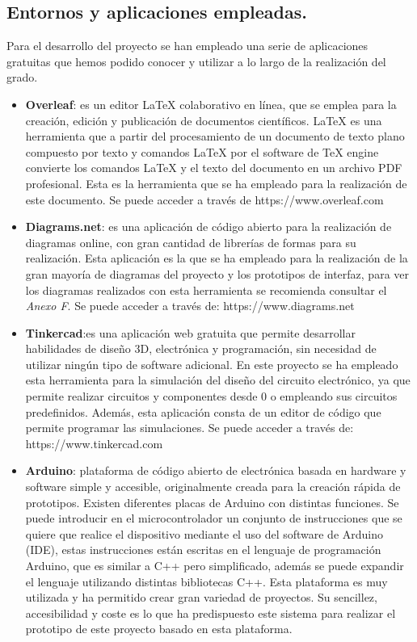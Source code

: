 \subsection{Entornos y aplicaciones empleadas.}
Para el desarrollo del proyecto se han empleado una serie de aplicaciones gratuitas que hemos podido conocer y utilizar a lo largo de la realización del grado. 
\begin{itemize}
\item \textbf{Overleaf}\cite{Overleaf}: es un editor LaTeX colaborativo en línea, que se emplea para la creación, edición y publicación de documentos científicos. LaTeX es una herramienta que a partir del procesamiento de un documento de texto plano compuesto por texto y comandos LaTeX por el software de TeX engine convierte los comandos LaTeX y el texto del documento en un archivo PDF profesional. Esta es la herramienta que se ha empleado para la realización de este documento. Se puede acceder a través de https://www.overleaf.com  %

\item \textbf{Diagrams.net}\cite{Diagrams.net}: es una aplicación de código abierto para la realización de diagramas online, con gran cantidad de librerías de formas para su realización. Esta aplicación es la que se ha empleado para la realización de la gran mayoría de diagramas del proyecto y los prototipos de interfaz, para ver los diagramas realizados con esta herramienta se recomienda consultar el \textit{Anexo F}. Se puede acceder a través de: https://www.diagrams.net %

\item \textbf{Tinkercad}\cite{Tinkercad}:es una aplicación web gratuita que permite desarrollar habilidades de diseño 3D, electrónica y programación, sin necesidad de utilizar ningún tipo de software adicional. En este proyecto se ha empleado esta herramienta para la simulación del diseño del circuito electrónico, ya que permite realizar circuitos y componentes desde 0 o empleando sus circuitos predefinidos. Además, esta aplicación consta de un editor de código que permite programar las simulaciones. Se puede acceder a través de: https://www.tinkercad.com %

\item \textbf{Arduino}\cite{Arduino1, Arduino2}: plataforma de código abierto de electrónica basada en hardware y software simple y accesible, originalmente creada para la creación rápida de prototipos. Existen diferentes placas de Arduino con distintas funciones. Se puede introducir en el microcontrolador un conjunto de instrucciones que se quiere que realice el dispositivo mediante el uso del software de Arduino (IDE), estas instrucciones están escritas en el lenguaje de programación Arduino, que es similar a C++ pero simplificado, además se puede expandir el lenguaje utilizando distintas bibliotecas C++. Esta plataforma es muy utilizada y ha permitido crear gran variedad de proyectos. Su sencillez, accesibilidad y coste es lo que ha predispuesto este sistema para realizar el prototipo de este proyecto basado en esta plataforma. 


\end{itemize}

